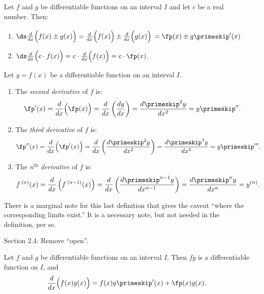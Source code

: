 \documentclass{article}
\begin{document}
{Let $f$ and $g$ be differentiable functions on an interval $I$ and let $c$ be a real number. Then:
	\begin{enumerate}
	\item	{}
	
	$\ds \frac{d}{dx}\Big(f(x) \pm g(x)\Big) = \frac{d}{dx}\Big(f(x)\Big) \pm \frac{d}{dx}\Big(g(x)\Big)$ $= \rule{0pt}{15pt}\fp(x)\pm g\primeskip'(x)$
	\item		{}
	
	$\ds \frac{d}{dx}\Big(c\cdot f(x)\Big) = c\cdot\frac{d}{dx}\Big(f(x)\Big) = c\cdot\fp(x)$.
	\end{enumerate}
}

{Let $y=f(x)$ be a differentiable function on an interval $I$. 
		\begin{enumerate}
		\item		The \textit{second derivative} of $f$ is: 
						$$ \fp'(x) = \frac{d}{dx}\Big(\fp(x)\Big) = \frac{d}{dx}\left(\frac{dy}{dx}\right) = \frac{d\primeskip^2y}{dx^2}=y\primeskip''.$$
				\item		The \textit{third derivative} of $f$ is: 
						$$ \fp''(x) = \frac{d}{dx}\Big(\fp'(x)\Big) = \frac{d}{dx}\left(\frac{d\primeskip^2y}{dx^2}\right) = \frac{d\primeskip^3y}{dx^3}=y\primeskip'''.$$
				\item		The \textit{n$^{\text{th}}$ derivative} of $f$ is:
						$$ f\,^{(n)}(x) = \frac{d}{dx}\left(f\,^{(n-1)}(x)\right) = \frac{d}{dx}\left(\frac{d\primeskip^{n-1}y}{dx^{n-1}}\right) = \frac{d\primeskip^ny}{dx^n}=y^{(n)}.$$
		\end{enumerate}
}

There is a marginal note for this last definition that gives the caveat ``where the corresponding limits exist.'' It is a necessary note, but not needed in the definition, per se.

Section 2.4: Remove ``open''.

{Let $f$ and $g$ be differentiable functions on an  interval $I$. Then $fg$ is a differentiable function on $I$, and $$\frac{d}{dx}\Big(f(x)g(x)\Big) = f(x)g\primeskip'(x) + \fp(x)g(x).$$}
\end{document}
